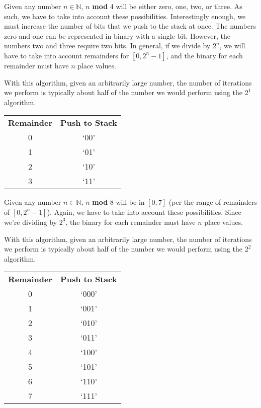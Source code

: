 \documentclass[12pt]{article}
\begin{document}
\par Given any number $n\in\mathbb{N}$, $n$ \textbf{mod} 4 will be either zero, one, two, or three. As such, we have to take into account these possibilities. Interestingly enough, we must increase the number of bits that we push to the stack at once. The numbers zero and one can be represented in binary with a single bit. However, the numbers two and three require two bits. In general, if we divide by $2^n$, we will have to take into account remainders for $[0,2^n-1]$, and the binary for each remainder must have $n$ place values.

\par With this algorithm, given an arbitrarily large number, the number of iterations we perform is typically about half of the number we would perform using the $2^1$ algorithm.

\begin{center}
  \begin{tabular}{c|c}
    \textbf{Remainder} & \textbf{Push to Stack} \\
    0 & `00' \\
    1 & `01' \\
    2 & `10' \\
    3 & `11'
  \end{tabular}
\end{center}

\par Given any number $n\in\mathbb{N}$, $n$ \textbf{mod} 8 will be in $[0,7]$ (per the range of remainders of $[0,2^n-1]$). Again, we have to take into account these possibilities. Since we're dividing by $2^3$, the binary for each remainder must have $n$ place values.

\par With this algorithm, given an arbitrarily large number, the number of iterations we perform is typically about half of the number we would perform using the $2^2$ algorithm.

\begin{center}
  \begin{tabular}{c|c}
    \textbf{Remainder} & \textbf{Push to Stack} \\
    0 & `000' \\
    1 & `001' \\
    2 & `010' \\
    3 & `011' \\
    4 & `100' \\
    5 & `101' \\
    6 & `110' \\
    7 & `111'
  \end{tabular}
\end{center}
\end{document}

